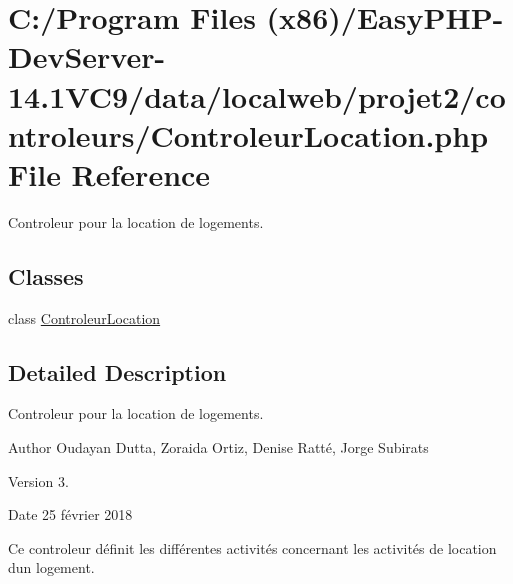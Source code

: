 \hypertarget{_controleur_location_8php}{}\section{C\+:/\+Program Files (x86)/\+Easy\+P\+H\+P-\/\+Dev\+Server-\/14.1\+V\+C9/data/localweb/projet2/controleurs/\+Controleur\+Location.php File Reference}
\label{_controleur_location_8php}


Controleur pour la location de logements.  


\subsection*{Classes}
\begin{DoxyCompactItemize}
\item 
class \hyperlink{class_controleur_location}{Controleur\+Location}
\end{DoxyCompactItemize}


\subsection{Detailed Description}
Controleur pour la location de logements. 

\begin{DoxyAuthor}{Author}
Oudayan Dutta, Zoraida Ortiz, Denise Ratté, Jorge Subirats 
\end{DoxyAuthor}
\begin{DoxyVersion}{Version}
3. 
\end{DoxyVersion}
\begin{DoxyDate}{Date}
25 février 2018
\end{DoxyDate}
Ce controleur définit les différentes activités concernant les activités de location d\textquotesingle{}un logement. 
